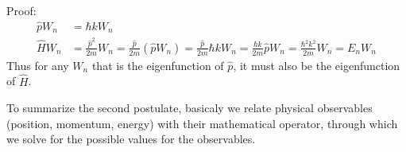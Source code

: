 \documentclass{school-22.101-notes}
\begin{document}
\begin{enumerate}
 Proof:
\begin{align}
\hat{p} W_n &= \hbar k W_n \\
\hat{H} W_n &= \frac{\hat{p}^2}{2m} W_n 
= \frac{\hat{p}}{2m} (\hat{p} W_n) 
= \frac{\hat{p}}{2m} \hbar k W_n = \frac{\hbar k}{2m} \hat{p} W_n = \frac{\hbar^2 k^2}{2m} W_n = E_n W_n
\end{align}
Thus for any $W_n$ that is the eigenfunction of $\hat{p}$, it must also be the eigenfunction of $\hat{H}$. 
\end{enumerate}
To summarize the second postulate, basicaly we relate physical observables (position, momentum, energy) with their mathematical operator, through which we solve for the possible values for the observables.
\end{document}
